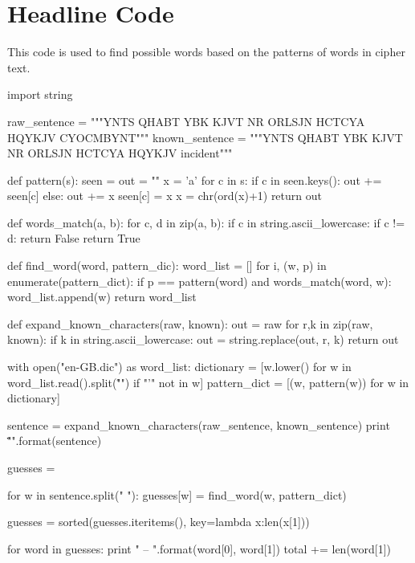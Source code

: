 \documentclass[11pt,a4paper,twoside]{article}
\begin{document}
\vfill
\pagebreak
\section{Headline Code}
\label{headline_code}
This code is used to find possible words based on the patterns of words in
cipher text. 
\begin{python}
import string


raw_sentence =   """YNTS QHABT YBK KJVT NR ORLSJN 
                 HCTCYA HQYKJV CYOCMBYNT"""
known_sentence = """YNTS QHABT YBK KJVT NR ORLSJN 
                 HCTCYA HQYKJV incident"""


def pattern(s):
    seen = {}
    out = ""
    x = 'a'
    for c in s:
        if c in seen.keys():
            out += seen[c]
        else:
            out += x
            seen[c] = x
            x = chr(ord(x)+1)
    return out

def words_match(a, b):
    for c, d in zip(a, b):
        if c in string.ascii_lowercase:
            if c != d:
                return False
    return True

def find_word(word, pattern_dic):
    word_list = []
    for i, (w, p) in enumerate(pattern_dict):
        if p == pattern(word) and words_match(word, w):
            word_list.append(w)
    return word_list

def expand_known_characters(raw, known):
    out = raw
    for r,k in zip(raw, known): 
      if k in string.ascii_lowercase:
          out = string.replace(out, r, k)
    return out

with open("en-GB.dic") as word_list:
    dictionary = [w.lower() for w 
                  in word_list.read().split("\r\n") 
                  if "'" not in w]
    pattern_dict = [(w, pattern(w)) for w in dictionary]

sentence = expand_known_characters(raw_sentence, 
                                   known_sentence)
print "\"{}\"\n".format(sentence)

guesses = {}

for w in sentence.split(" "):
    guesses[w] = find_word(w, pattern_dict)

guesses = sorted(guesses.iteritems(), key=lambda x:len(x[1]))

for word in guesses:
    print "{} -- {}\n".format(word[0], word[1])
    total += len(word[1])
\end{python}
\end{document}
